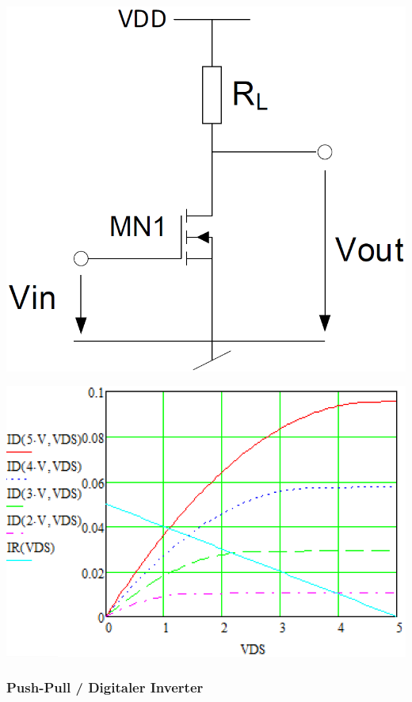 \begin{minipage}[c]{0.4\columnwidth}
    \includegraphics[width=0.9\columnwidth]{images/source_schaltung.png}
\end{minipage}
\hfill
\begin{minipage}[c]{0.5\columnwidth}
    \includegraphics[width=\columnwidth]{images/source_schaltung_lastgerade.png}
\end{minipage}


\subsubsection{Push-Pull / Digitaler Inverter}  %

